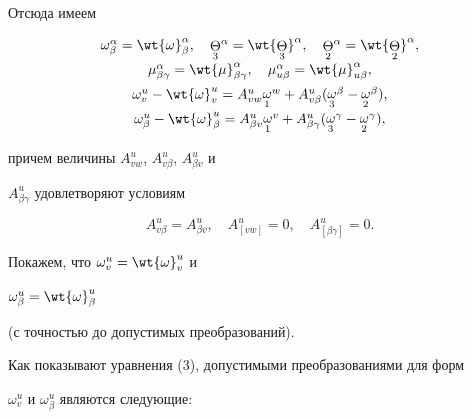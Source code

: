 Отсюда имеем


\begin{equation}


\begin{array}{c}


\omega^{\alpha}_{\beta}=\wt{\omega}^{\alpha}_{\beta},


\quad {\crazy{\Theta}{3}}^{\alpha}=\wt{\crazy{\Theta}{3}}^{\alpha},


\quad {\crazy{\Theta}{2}}^{\alpha}=\wt{\crazy{\Theta}{2}}^{\alpha},\\[2mm]


%


\mu^{\alpha}_{\beta \gamma}=\wt{\mu}^{\alpha}_{\beta \gamma}, \quad


\mu^{\alpha}_{u \beta}=\wt{\mu}^{\alpha}_{u \beta},\\[2mm]


\omega^{u}_{v}-\wt{\omega}^{u}_{v}=


A^{u}_{v w}{\crazy{\omega}{1}}^{w}+A^{u}_{v \beta}({\crazy{\omega}{3}}^{\beta}-


{\crazy{\omega}{2}}^{\beta}),\\[2mm]


%


\omega^{u}_{\beta}-\wt{\omega}^{u}_{\beta}=


A^{u}_{\beta v}{\crazy{\omega}{1}}^{v}+A^{u}_{\beta \gamma}({\crazy{\omega}{3}}^{\gamma}-


{\crazy{\omega}{2}}^{\gamma}),


\end{array}


\end{equation}


причем величины  $A^{u}_{vw}$,  $A^{u}_{v \beta}$, $A^{u}_{\beta v}$ и


$A^{u}_{\beta \gamma}$ удовлетворяют  условиям


$$


A^{u}_{v \beta}=A^{u}_{\beta v},


\quad A^{u}_{[v w]}=0, \quad A^{u}_{[\beta \gamma]}=0.


$$


Покажем, что $\omega^{u}_{v}=\wt{\omega}^{u}_{v}$ и


$\omega^{u}_{\beta}=\wt{\omega}^{u}_{\beta}$


(с точностью до допустимых преобразований).


Как показывают уравнения (3), допустимыми преобразованиями для форм


$\omega^{u}_{v}$ и $\omega^{u}_{\beta}$ являются следующие:



